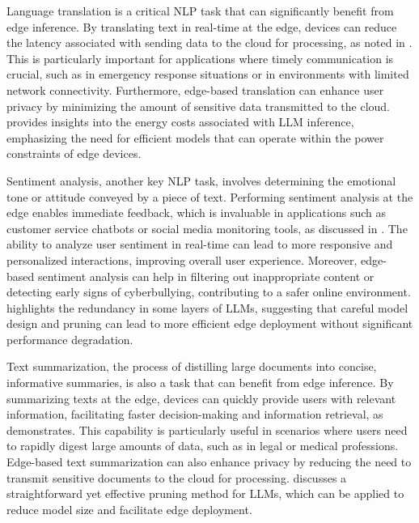 \documentclass[11pt,a4paper]{article}
\begin{document}
Language translation is a critical NLP task that can significantly benefit from edge inference. By translating text in real-time at the edge, devices can reduce the latency associated with sending data to the cloud for processing, as noted in \cite{doi:10.1145/3466752.3480095}. This is particularly important for applications where timely communication is crucial, such as in emergency response situations or in environments with limited network connectivity. Furthermore, edge-based translation can enhance user privacy by minimizing the amount of sensitive data transmitted to the cloud. \cite{doi:10.1109/hpec58863.2023.10363447} provides insights into the energy costs associated with LLM inference, emphasizing the need for efficient models that can operate within the power constraints of edge devices.

Sentiment analysis, another key NLP task, involves determining the emotional tone or attitude conveyed by a piece of text. Performing sentiment analysis at the edge enables immediate feedback, which is invaluable in applications such as customer service chatbots or social media monitoring tools, as discussed in \cite{doi:10.1145/3788870}. The ability to analyze user sentiment in real-time can lead to more responsive and personalized interactions, improving overall user experience. Moreover, edge-based sentiment analysis can help in filtering out inappropriate content or detecting early signs of cyberbullying, contributing to a safer online environment. \cite{arxiv:2403.03853} highlights the redundancy in some layers of LLMs, suggesting that careful model design and pruning can lead to more efficient edge deployment without significant performance degradation.

Text summarization, the process of distilling large documents into concise, informative summaries, is also a task that can benefit from edge inference. By summarizing texts at the edge, devices can quickly provide users with relevant information, facilitating faster decision-making and information retrieval, as \cite{arxiv:2412.15304} demonstrates. This capability is particularly useful in scenarios where users need to rapidly digest large amounts of data, such as in legal or medical professions. Edge-based text summarization can also enhance privacy by reducing the need to transmit sensitive documents to the cloud for processing. \cite{arxiv:2306.11695} discusses a straightforward yet effective pruning method for LLMs, which can be applied to reduce model size and facilitate edge deployment.
\end{document}
